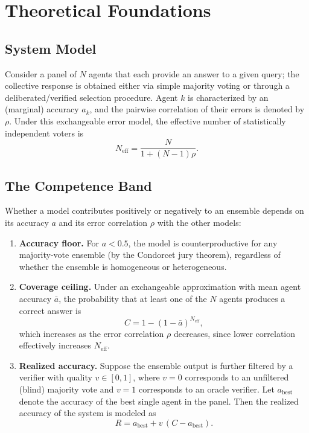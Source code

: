 \documentclass[manuscript,screen,review]{acmart}
\begin{document}
\section{Theoretical Foundations}
\subsection{System Model}
Consider a panel of $N$ agents that each provide an answer to a given query; the collective response is obtained either via simple majority voting or through a deliberated/verified selection procedure. Agent $k$ is characterized by an (marginal) accuracy $a_k$, and the pairwise correlation of their errors is denoted by $\rho$. Under this exchangeable error model, the effective number of statistically independent voters is
\begin{equation}
N_{\mathrm{eff}} = \frac{N}{1 + (N - 1)\rho}.
\end{equation}

\subsection{The Competence Band}
Whether a model contributes positively or negatively to an ensemble depends on its accuracy $a$ and its error correlation $\rho$ with the other models:

\begin{enumerate}
\item \textbf{Accuracy floor.} For $a < 0.5$, the model is counterproductive for any majority-vote ensemble (by the Condorcet jury theorem), regardless of whether the ensemble is homogeneous or heterogeneous.

\item \textbf{Coverage ceiling.} Under an exchangeable approximation with mean agent accuracy $\bar a$, the probability that at least one of the $N$ agents produces a correct answer is
\begin{equation}
C = 1 - (1 - \bar a)^{N_{\mathrm{eff}}},
\end{equation}
which increases as the error correlation $\rho$ decreases, since lower correlation effectively increases $N_{\mathrm{eff}}$.

\item \textbf{Realized accuracy.} Suppose the ensemble output is further filtered by a verifier with quality $v \in [0,1]$, where $v=0$ corresponds to an unfiltered (blind) majority vote and $v=1$ corresponds to an oracle verifier. Let $a_{\mathrm{best}}$ denote the accuracy of the best single agent in the panel. Then the realized accuracy of the system is modeled as
\begin{equation}
R = a_{\mathrm{best}} + v\,(C - a_{\mathrm{best}}).
\end{equation}
\end{enumerate}
\end{document}
